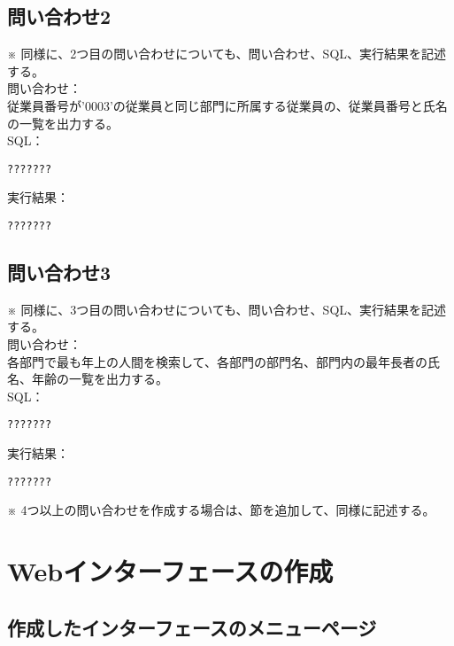 \documentclass[a4j,12pt]{jreport}
\begin{document}
\section{問い合わせ2}

※ 同様に、2つ目の問い合わせについても、問い合わせ、SQL、実行結果を記述する。\\

問い合わせ：\\
従業員番号が'0003'の従業員と同じ部門に所属する従業員の、従業員番号と氏名の一覧を出力する。\\

SQL：
\begin{verbatim}
???????
\end{verbatim}
\vspace{3mm}

実行結果：
\begin{verbatim}
???????
\end{verbatim}


\section{問い合わせ3}

※ 同様に、3つ目の問い合わせについても、問い合わせ、SQL、実行結果を記述する。\\

問い合わせ：\\
各部門で最も年上の人間を検索して、各部門の部門名、部門内の最年長者の氏名、年齢の一覧を出力する。\\

SQL：
\begin{verbatim}
???????
\end{verbatim}

実行結果：
\begin{verbatim}
???????
\end{verbatim}

※ 4つ以上の問い合わせを作成する場合は、節を追加して、同様に記述する。\\


\chapter{Webインターフェースの作成}

\section{作成したインターフェースのメニューページ}
\end{document}
